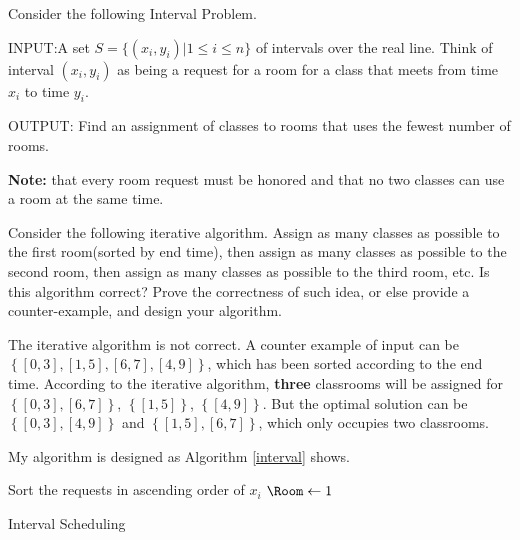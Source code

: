 \begin{exercise}[]{Consider the following Interval Problem. 

  INPUT:A set $S = \{(x_i, y_i)|1 \leq  i \leq  n\}$ of intervals over the real line. Think of interval $(x_i
  , y_i)$ as being a request for a room for a class that meets from time $x_i$ to time $y_i$.

  OUTPUT: Find an assignment of classes to rooms that uses the fewest number of rooms.

  \textbf{Note:} that every room request must be honored and that no two classes can use a room at the same
  time.

  
  Consider the following iterative algorithm. Assign as many classes as possible to the first room(sorted by end time), then assign as many classes as possible to the second room, then assign as many classes as possible to the third room, etc. Is this algorithm correct? Prove the correctness of such idea, or else provide a counter-example, and design your algorithm.}
  \begin{solution}
    The iterative algorithm is not correct. A counter example of input can be $\left\{ [0,3],[1,5],[6,7],[4,9] \right\}$, which has been sorted according to the end time. According to the iterative algorithm, \textbf{three} classrooms will be assigned for $\left\{ [0,3],[6,7] \right\}$, $\left\{ [1,5]\right\}$, $\left\{ [4,9] \right\}$. But the optimal solution can be $\left\{ [0,3],[4,9] \right\}$ and $\left\{ [1,5],[6,7] \right\}$, which only occupies two classrooms.

    My algorithm is designed as Algorithm \ref{interval} shows.

  \begin{algorithm}[H]
    \BlankLine
    Sort the requests in ascending order of $x_i$ \;
    $\Room \leftarrow 1$ \;
    \Return
    \caption{Interval Scheduling \label{interval}}
  \end{algorithm}
  \end{solution}
  \label{ex3}
\end{exercise}



